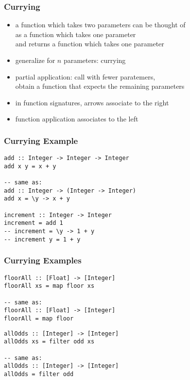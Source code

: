 \documentclass[dvipsnames]{beamer}
\theoremstyle{plain}
\begin{document}
\begin{frame}
  \frametitle{Currying}

  \begin{itemize}
    \item a function which takes two parameters can be thought of\\
      as a function which takes one parameter\\
      and returns a function which takes one parameter
    \item generalize for $n$ parameters: \alert{currying}

    \pause
    \bigskip
    \item \alert{partial application}: call with fewer paratemers,\\
      obtain a function that expects the remaining parameters

    \item in function signatures, arrows associate to the right
    \item function application associates to the left
  \end{itemize}
\end{frame}

\begin{frame}[fragile]
  \frametitle{Currying Example}

  \begin{exampleblock}{}
    \begin{lstlisting}
add :: Integer -> Integer -> Integer
add x y = x + y

-- same as:
add :: Integer -> (Integer -> Integer)
add x = \y -> x + y

increment :: Integer -> Integer
increment = add 1
-- increment = \y -> 1 + y
-- increment y = 1 + y
    \end{lstlisting}
  \end{exampleblock}
\end{frame}

\begin{frame}[fragile]
  \frametitle{Currying Examples}

  \begin{exampleblock}{}
    \begin{lstlisting}
floorAll :: [Float] -> [Integer]
floorAll xs = map floor xs

-- same as:
floorAll :: [Float] -> [Integer]
floorAll = map floor
    \end{lstlisting}
  \end{exampleblock}

  \begin{exampleblock}{}
    \begin{lstlisting}
allOdds :: [Integer] -> [Integer]
allOdds xs = filter odd xs

-- same as:
allOdds :: [Integer] -> [Integer]
allOdds = filter odd
    \end{lstlisting}
  \end{exampleblock}
\end{frame}
\end{document}
